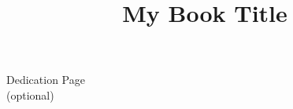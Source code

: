 \documentclass{ws-book9x6}
\title{My Book Title}      %
\begin{document}
\titlepages                        %

\begin{dedication}
\large Dedication Page \\[13pt]    %
\large (optional)
\end{dedication}




\tableofcontents



\setcounter{page}{1}












% 

\printindex
\end{document}
